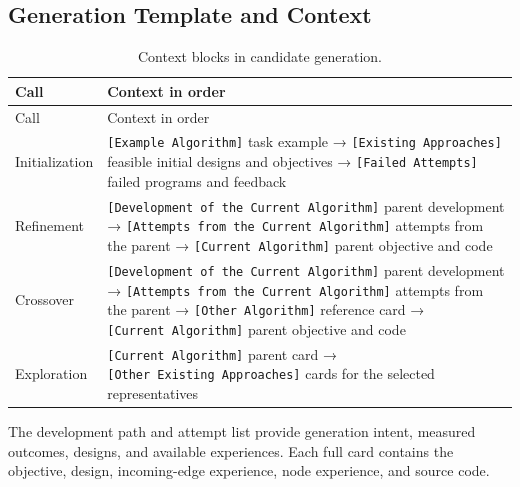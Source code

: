 \documentclass{article}
\begin{document}
\subsection{Generation Template and Context}\label{generation-template-and-context}

\begin{longtable}[]{@{}
  >{\raggedright\arraybackslash}p{}
  >{\raggedright\arraybackslash}p{}@{}}
\caption{Context blocks in candidate generation.}\tabularnewline
\toprule\noalign{}
\begin{minipage}[b]{\linewidth}\raggedright
Call
\end{minipage} & \begin{minipage}[b]{\linewidth}\raggedright
Context in order
\end{minipage} \\
\midrule\noalign{}
\endfirsthead
\toprule\noalign{}
\begin{minipage}[b]{\linewidth}\raggedright
Call
\end{minipage} & \begin{minipage}[b]{\linewidth}\raggedright
Context in order
\end{minipage} \\
\midrule\noalign{}
\endhead
\bottomrule\noalign{}
\endlastfoot
Initialization & \texttt{{[}Example\ Algorithm{]}} task example → \texttt{{[}Existing\ Approaches{]}} feasible initial designs and objectives → \texttt{{[}Failed\ Attempts{]}} failed programs and feedback \\
Refinement & \texttt{{[}Development\ of\ the\ Current\ Algorithm{]}} parent development → \texttt{{[}Attempts\ from\ the\ Current\ Algorithm{]}} attempts from the parent → \texttt{{[}Current\ Algorithm{]}} parent objective and code \\
Crossover & \texttt{{[}Development\ of\ the\ Current\ Algorithm{]}} parent development → \texttt{{[}Attempts\ from\ the\ Current\ Algorithm{]}} attempts from the parent → \texttt{{[}Other\ Algorithm{]}} reference card → \texttt{{[}Current\ Algorithm{]}} parent objective and code \\
Exploration & \texttt{{[}Current\ Algorithm{]}} parent card → \texttt{{[}Other\ Existing\ Approaches{]}} cards for the selected representatives \\
\end{longtable}

The development path and attempt list provide generation intent, measured outcomes, designs, and available experiences. Each full card contains the objective, design, incoming-edge experience, node experience, and source code.
\end{document}
